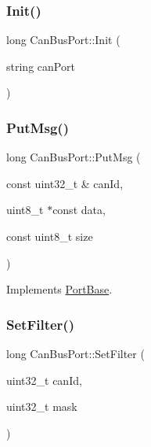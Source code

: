 \mbox{\label{classCanBusPort_a0de0778cfc475d2da559668be55f6015}} 
\subsubsection{\texorpdfstring{Init()}{Init()}}
{\footnotesize\ttfamily long Can\+Bus\+Port\+::\+Init (\begin{DoxyParamCaption}\item[{string}]{can\+Port }\end{DoxyParamCaption})\hspace{0.3cm}{\ttfamily [private]}}

\mbox{\label{classCanBusPort_a2bb802ad7a14e260f0f51b79d4c53c43}} 
\subsubsection{\texorpdfstring{Put\+Msg()}{PutMsg()}}
{\footnotesize\ttfamily long Can\+Bus\+Port\+::\+Put\+Msg (\begin{DoxyParamCaption}\item[{const uint32\+\_\+t \&}]{can\+Id,  }\item[{uint8\+\_\+t $\ast$const}]{data,  }\item[{const uint8\+\_\+t}]{size }\end{DoxyParamCaption})\hspace{0.3cm}{\ttfamily [virtual]}}



Implements \hyperlink{classPortBase_a26213ebb6ea0a0b77f60c28944e3bb8e}{Port\+Base}.

\mbox{\label{classCanBusPort_af09c794e3af86e89c8a511535f856dc9}} 
\subsubsection{\texorpdfstring{Set\+Filter()}{SetFilter()}}
{\footnotesize\ttfamily long Can\+Bus\+Port\+::\+Set\+Filter (\begin{DoxyParamCaption}\item[{uint32\+\_\+t}]{can\+Id,  }\item[{uint32\+\_\+t}]{mask }\end{DoxyParamCaption})\hspace{0.3cm}{\ttfamily [virtual]}}



